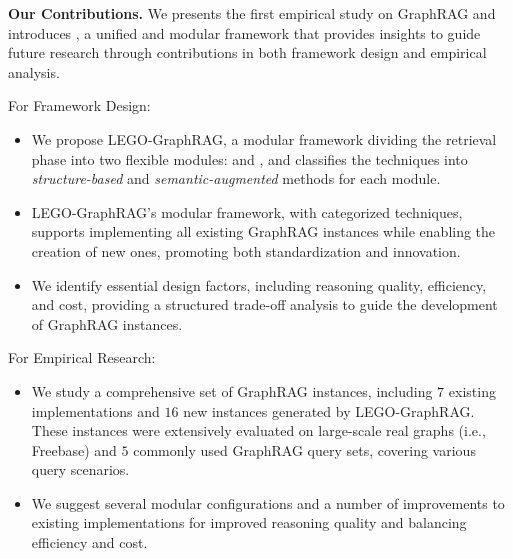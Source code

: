 \textbf{Our Contributions.}
We presents the first empirical study on GraphRAG and introduces {\it {\ourmethod}}, a unified and modular framework that provides insights to guide future research through contributions in both framework design and empirical analysis. 

For Framework Design:

\begin{itemize} [leftmargin=12pt]
    \item We propose LEGO-GraphRAG, a modular framework dividing the retrieval phase into two flexible modules: {\it {\preRetrieval}} and {\it {\retrieval}}, and classifies the techniques into {\it structure-based} and {\it semantic-augmented} methods for  each module.
    \item LEGO-GraphRAG’s modular framework, with categorized techniques, supports implementing all existing GraphRAG instances while enabling the creation of new ones, promoting both standardization and innovation.
    \item We identify essential design factors, including reasoning quality, efficiency, and cost, providing a structured trade-off analysis to guide the development of GraphRAG instances.
\end{itemize}
For Empirical Research:

\begin{itemize}[leftmargin=12pt]
    \item We study a comprehensive set of GraphRAG instances, including $7$ existing implementations and $16$ new instances generated by LEGO-GraphRAG. These instances were extensively evaluated on large-scale real graphs (i.e., Freebase) and $5$ commonly used GraphRAG query sets, covering various query scenarios.
    \item We suggest several modular configurations and a number of improvements to existing implementations for improved reasoning quality and balancing efficiency and cost.
\end{itemize}



